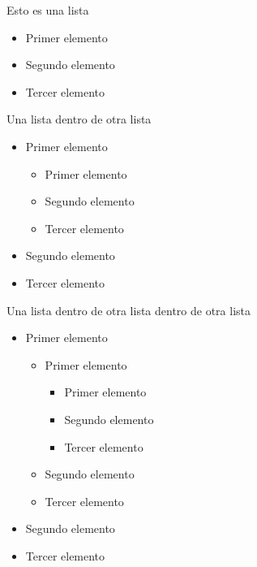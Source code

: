 \documentclass{article}
\begin{document}
Esto es una lista

\begin{itemize}
    \item Primer elemento 
    \item Segundo elemento
    \item Tercer elemento
\end{itemize}

Una lista dentro de otra lista

\begin{itemize}
    \item Primer elemento 
    \begin{itemize}
        \item Primer elemento 
        \item Segundo elemento
        \item Tercer elemento
    \end{itemize}
    \item Segundo elemento
    \item Tercer elemento
\end{itemize}

Una lista dentro de otra lista dentro de otra lista

\begin{itemize}
    \item Primer elemento 
    \begin{itemize}
        \item Primer elemento 
        \begin{itemize}
            \item Primer elemento 
            \item Segundo elemento
            \item Tercer elemento
        \end{itemize}
        \item Segundo elemento
        \item Tercer elemento
    \end{itemize}
    \item Segundo elemento
    \item Tercer elemento
\end{itemize}
\end{document}
